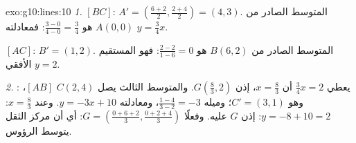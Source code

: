 \begin{solution}{exo:g10:lines:10}
\emph{1.}  $[BC]$: $A' = \left(\frac{6+2}{2},
\frac{2+4}{2}\right) = (4, 3)$.  المتوسط الصادر من $A(0,0)$ هو
$\frac{3 - 0}{4 - 0} = \frac34$: فمعادلته $y = \frac34 x$.

 $[AC]$: $B' = (1, 2)$.  المتوسط الصادر من $B(6, 2)$ هو
$\frac{2 - 2}{1 - 6} = 0$: فهو المستقيم الأفقي $y = 2$.

\emph{2.} : يعطي $\frac34 x = 2$ أن $x = \frac83$، إذن
$G\left(\frac83, 2\right)$. والمتوسط الثالث يصل $C(2,4)$ 
$[AB]$، وهو $C' = (3, 1)$؛ وميله
$\frac{1 - 4}{3 - 2} = -3$، ومعادلته $y = -3x + 10$. وعند $x = \frac83$:
$y = -8 + 10 = 2$: إذن $G$ عليه. وفعلًا
$G = \left(\frac{0 + 6 + 2}{3}, \frac{0 + 2 + 4}{3}\right)$: أي أن
مركز الثقل يتوسط  الرؤوس.
\end{solution}

